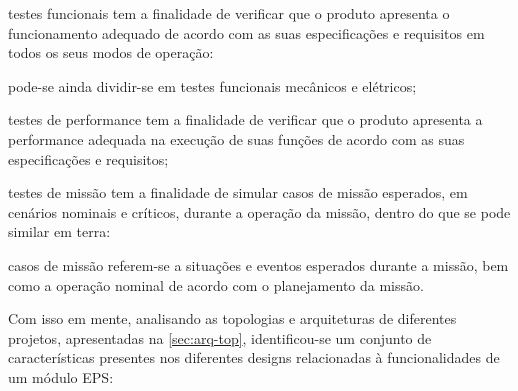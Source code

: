\begin{alineas}
    \item testes funcionais tem a finalidade de verificar que o produto apresenta o funcionamento adequado de acordo com as suas especificações e requisitos em todos os seus modos de operação:
    \begin{alineas}
        \item pode-se ainda dividir-se em testes funcionais mecânicos e elétricos;
    \end{alineas}
    \item testes de performance tem a finalidade de verificar que o produto apresenta a performance adequada na execução de suas funções de acordo com as suas especificações e requisitos;
    \item testes de missão tem a finalidade de simular casos de missão esperados, em cenários nominais e críticos, durante a operação da missão, dentro do que se pode similar em terra:
    \begin{alineas}
        \item casos de missão referem-se a situações e eventos esperados durante a missão, bem como a operação nominal de acordo com o planejamento da missão.
    \end{alineas}
\end{alineas}

Com isso em mente, analisando as topologias e arquiteturas de diferentes projetos, apresentadas na \autoref{sec:arq-top}, identificou-se um conjunto de características presentes nos diferentes designs relacionadas à funcionalidades de um módulo \gls{EPS}:

